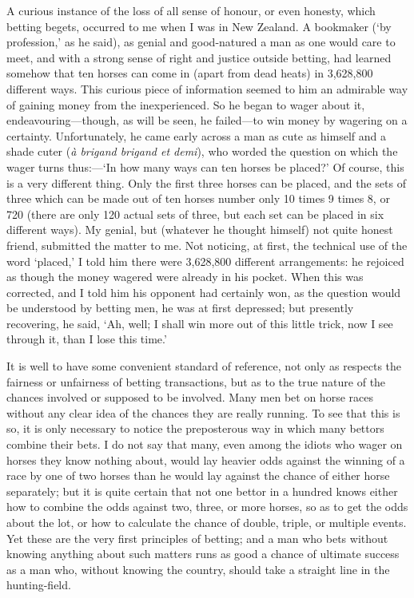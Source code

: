 \documentclass[letterpaper,12pt,oneside,openany]{memoir}
\begin{document}
A curious instance of the loss of all sense of honour,
or even honesty, which betting begets, occurred to
me when I was in New Zealand. A bookmaker (`by
profession,' as he said), as genial and good-natured
a man as one would care to meet, and with a strong
sense of right and justice outside betting, had learned
somehow that ten horses can come in (apart from dead
heats) in 3,628,800 different ways. This curious piece
of information seemed to him an admirable way of
gaining money from the inexperienced. So he began
to wager about it, endeavouring---though, as will be
seen, he failed---to win money by wagering on a certainty.
Unfortunately, he came early across a man as
cute as himself and a shade
cuter (\emph{\`a brigand brigand et demi}), who worded the
question on which the wager
turns thus:---`In how many ways can ten horses be
placed?' Of course, this is a very different thing.
Only the first three horses can be placed, and the sets
of three which can be made out of ten horses number
only 10 times 9 times 8, or 720 (there are only 120
actual sets of three, but each set can be placed in six
different ways). My genial, but (whatever he thought
himself) not quite honest friend, submitted the matter
to me. Not noticing, at first, the technical use of
the word `placed,' I told him there were 3,628,800
different arrangements: he rejoiced as though the
money wagered were already in his pocket. When
this was corrected, and I told him his opponent had
certainly won, as the question would be understood by
betting men, he was at first depressed; but presently
recovering, he said, `Ah, well; I shall win more out of
this little trick, now I see through it, than I lose this
time.'

It is well to have some convenient standard of
reference, not only as respects the fairness or unfairness
of betting transactions, but as to the true nature of the
chances involved or supposed to be involved. Many
men bet on horse races without any clear idea of the
chances they are really running. To see that this is so,
it is only necessary to notice the preposterous way in
which many bettors combine their bets. I do not say
that many, even among the idiots who wager on horses
they know nothing about, would lay heavier odds against
the winning of a race by one of two horses than he
would lay against the chance of either horse separately;
but it is quite certain that not one bettor in a hundred
knows either how to combine the odds against two,
three, or more horses, so as to get the odds about the
lot, or how to calculate the chance of double, triple, or
multiple events. Yet these are the very first principles
of betting; and a man who bets without knowing anything
about such matters runs as good a chance of
ultimate success as a man who, without knowing the
country, should take a straight line in the hunting-field.
\end{document}
